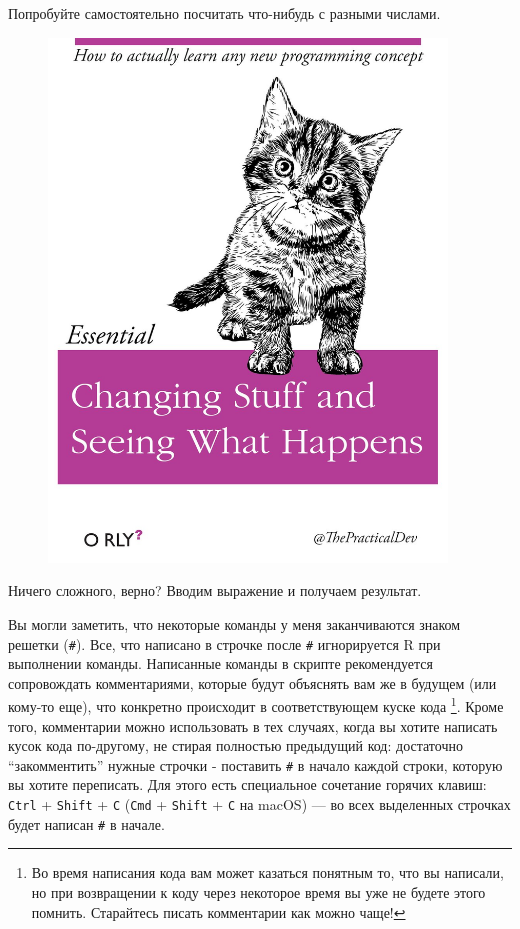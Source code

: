 \documentclass[]{book}
\begin{document}
Попробуйте самостоятельно посчитать что-нибудь с разными числами.

\begin{figure}
\centering
\includegraphics[width=4.16667in]{images/ThePracticalDev_2016-Apr-13.jpg}
\caption{}
\end{figure}

Ничего сложного, верно? Вводим выражение и получаем результат.

Вы могли заметить, что некоторые команды у меня заканчиваются знаком
решетки (\texttt{\#}). Все, что написано в строчке после \texttt{\#}
игнорируется R при выполнении команды. Написанные команды в скрипте
рекомендуется сопровождать комментариями, которые будут объяснять вам же
в будущем (или кому-то еще), что конкретно происходит в соответствующем
куске кода \footnote{Во время написания кода вам может казаться понятным
  то, что вы написали, но при возвращении к коду через некоторое время
  вы уже не будете этого помнить. Старайтесь писать комментарии как
  можно чаще!}. Кроме того, комментарии можно использовать в тех
случаях, когда вы хотите написать кусок кода по-другому, не стирая
полностью предыдущий код: достаточно ``закомментить'' нужные строчки -
поставить \texttt{\#} в начало каждой строки, которую вы хотите
переписать. Для этого есть специальное сочетание горячих клавиш:
\texttt{Ctrl} + \texttt{Shift} + \texttt{C} (\texttt{Cmd} +
\texttt{Shift} + \texttt{C} на macOS) --- во всех выделенных строчках
будет написан \texttt{\#} в начале.
\end{document}

